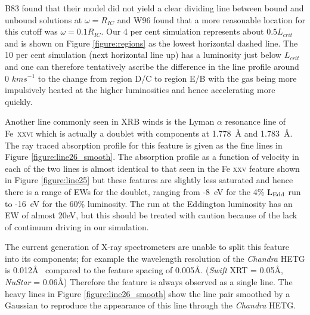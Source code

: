 \documentclass[a4paper,fleqn,usenatbib]{mnras}
\begin{document}
B83 found that their model did not yield a clear dividing line between bound and unbound solutions 
at $\omega=R_{IC}$ and W96 found that a more reasonable location for this cutoff was $\omega=0.1 R_{IC}$.
Our 4 per cent simulation represents about $0.5 L_{crit}$ and is shown on Figure \ref{figure:regions} as the lowest 
horizontal dashed line. The 10 per cent simulation (next horizontal line up) has a luminosity just below $L_{crit}$ 
and one can therefore tentatively ascribe the difference in the line profile around 0 $kms^{-1}$ to the change from 
region D/C to region E/B with the gas being more impulsively heated at the higher luminosities and hence 
accelerating more quickly.

Another line commonly seen in XRB winds is the Lyman $\alpha$ resonance 
line of Fe~\textsc{xxvi} which is actually a doublet with components at
1.778~{\AA} and 1.783~{\AA}. The ray traced absorption profile for this 
feature is given as the fine lines in Figure \ref{figure:line26_smooth}. The absorption profile
as a function of velocity in each of the two lines is almost identical to that seen in the 
Fe \textsc{xxv} feature shown in Figure \ref{figure:line25} but these features
are slightly less
saturated and hence there is a range of EWs for the doublet, ranging from -8~eV for the 4\% $\rm{L_{Edd}}$
run to -16~eV for the 60\% luminosity. The run at the Eddington luminosity 
has an EW of almost 20eV, but this should be treated with caution because of the lack
of continuum driving in our simulation.

The current generation of X-ray spectrometers are unable to split this feature
into its components; for example the wavelength resolution of the \emph{Chandra}
HETG is 0.012\AA~ compared to the feature spacing of 0.005\AA. (\emph{Swift} XRT = 0.05\AA,
\emph{NuStar} = 0.06\AA)
 Therefore the feature is always observed as a single line. The heavy lines in Figure 
 \ref{figure:line26_smooth}
show the line pair smoothed by a Gaussian to reproduce the appearance of this line
through the \emph{Chandra} HETG. 
\end{document}
